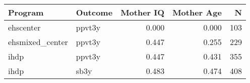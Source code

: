\begin{table}[ht]
\centering
\begin{tabular}{llrrr}
  \hline
Program & Outcome & Mother IQ & Mother Age & N \\ 
  \hline
ehscenter & ppvt3y & 0.000 & 0.000 & 103 \\ 
  ehsmixed\_center & ppvt3y & 0.447 & 0.255 & 229 \\ 
  ihdp & ppvt3y & 0.447 & 0.431 & 355 \\ 
  ihdp & sb3y & 0.483 & 0.474 & 408 \\ 
   \hline
\end{tabular}
\end{table}
